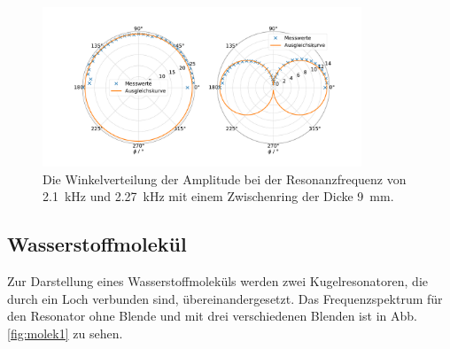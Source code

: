 \begin{figure}
    \centering
    \includegraphics[width=0.85\textwidth]{plots/C_polar5.pdf}
    \caption{Die Winkelverteilung der Amplitude bei der Resonanzfrequenz von \SI{2.1}{\kilo\hertz} und \SI{2.27}{\kilo\hertz} mit einem Zwischenring der Dicke \SI{9}{\milli\metre}.}
    \label{fig:polar2}
\end{figure}

\subsection{Wasserstoffmolekül}

Zur Darstellung eines Wasserstoffmoleküls werden zwei Kugelresonatoren, die durch ein Loch verbunden sind, übereinandergesetzt.
Das Frequenzspektrum für den Resonator ohne Blende und mit drei verschiedenen Blenden ist in Abb. \ref{fig:molek1} zu sehen.

